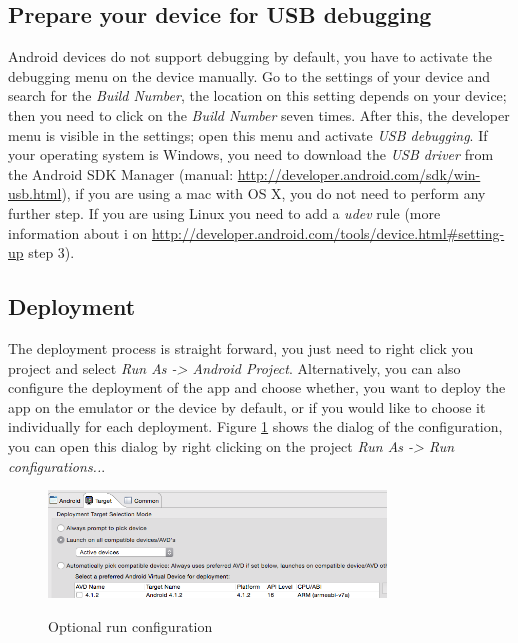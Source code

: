 \subsection{Prepare your device for USB debugging}
\label{sec:prepareyourdeviceforusbdebugging}
Android devices do not support debugging by default, you have to activate the debugging menu on the device manually. Go to the settings of your device and search for the \emph{Build Number}, the location on this setting depends on your device; then you need to click on the \emph{Build Number} seven times. After this, the developer menu is visible in the settings; open this menu and activate \emph{USB debugging}. If your operating system is Windows, you need to download the \emph{USB driver} from the Android SDK Manager (manual: \url{http://developer.android.com/sdk/win-usb.html}), if you are using a mac with OS X, you do not need to perform any further step. If you are using Linux you need to add a \emph{udev} rule (more information about i on \url{http://developer.android.com/tools/device.html#setting-up} step 3).
 
\subsection{Deployment}
\label{sec:deploytheclient}
The deployment process is straight forward, you just need to right click you project and select \emph{Run As -> Android Project}. Alternatively, you can also configure the deployment of the app and choose whether, you want to deploy the app on the emulator or the device by default, or if you would like to choose it individually for each deployment. Figure \ref{fig:run_config} shows the dialog of the configuration, you can open this dialog by right clicking on the project \emph{Run As -> Run configurations..}. 

\begin{figure}
  \begin{center}
    \includegraphics[width=0.8\textwidth]{./Figures/run_config}
    \label{fig:run_config}
    \caption{Optional run configuration}
  \end{center}
\end{figure}

